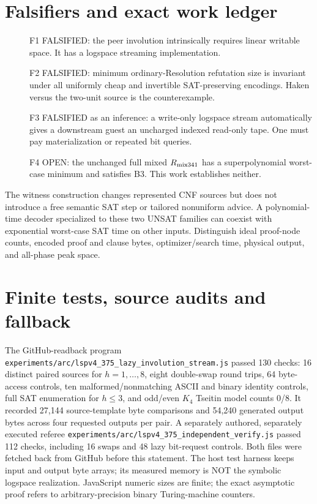 \documentclass[11pt]{article}
\begin{document}
\section*{Falsifiers and exact work ledger}
\begin{description}
\item[] F1 FALSIFIED: the peer involution intrinsically requires linear writable space. It has a logspace streaming implementation.
\item[] F2 FALSIFIED: minimum ordinary-Resolution refutation size is invariant under all uniformly cheap and invertible SAT-preserving encodings. Haken versus the two-unit source is the counterexample.
\item[] F3 FALSIFIED as an inference: a write-only logspace stream automatically gives a downstream guest an uncharged indexed read-only tape. One must pay materialization or repeated bit queries.
\item[] F4 OPEN: the unchanged full mixed $R_{\rm mix341}$ has a superpolynomial worst-case minimum and satisfies B3. This work establishes neither.
\end{description}
The witness construction changes represented CNF sources but does not introduce a free semantic SAT step or tailored nonuniform advice. A polynomial-time decoder specialized to these two UNSAT families can coexist with exponential worst-case SAT time on other inputs. Distinguish ideal proof-node counts, encoded proof and clause bytes, optimizer/search time, physical output, and all-phase peak space.

\section*{Finite tests, source audits and fallback}
The GitHub-readback program \texttt{experiments/arc/lspv4\_375\_lazy\_involution\_stream.js} passed 130 checks: 16 distinct paired sources for $h=1,\dots,8$, eight double-swap round trips, 64 byte-access controls, ten malformed/nonmatching ASCII and binary identity controls, full SAT enumeration for $h\le3$, and odd/even $K_4$ Tseitin model counts 0/8. It recorded 27,144 source-template byte comparisons and 54,240 generated output bytes across four requested outputs per pair. A separately authored, separately executed referee \texttt{experiments/arc/lspv4\_375\_independent\_verify.js} passed 112 checks, including 16 swaps and 48 lazy bit-request controls. Both files were fetched back from GitHub before this statement. The host test harness keeps input and output byte arrays; its measured memory is NOT the symbolic logspace realization. JavaScript numeric sizes are finite; the exact asymptotic proof refers to arbitrary-precision binary Turing-machine counters.
\end{document}
